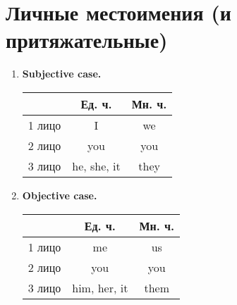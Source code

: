 \documentclass[oneside]{book}
\begin{document}
\section{Личные местоимения (и притяжательные)}
\begin{enumerate}
    \item \textbf{Subjective case.}
    \begin{center}
        \begin{tabular}{|c|c|c|}
            \hline

            & Ед. ч. & Мн. ч.
            \\
            \hline

            1 лицо & I & we
            \\
            \hline

            2 лицо & you & you
            \\
            \hline

            3 лицо & he, she, it & they
            \\
            \hline
        \end{tabular}
    \end{center}

    \item \textbf{Objective case.}
    \begin{center}
        \begin{tabular}{|c|c|c|}
            \hline

            & Ед. ч. & Мн. ч.
            \\
            \hline

            1 лицо & me & us
            \\
            \hline

            2 лицо & you & you
            \\
            \hline

            3 лицо & him, her, it & them
            \\
            \hline
        \end{tabular}
    \end{center}


\end{enumerate}
\end{document}
